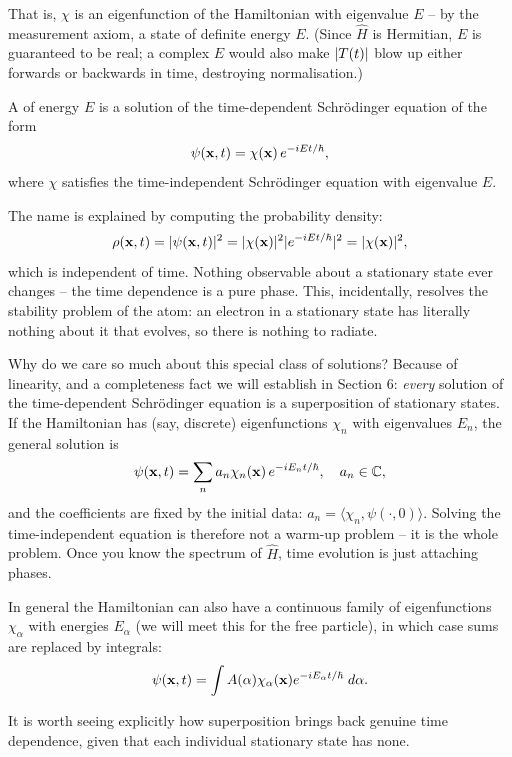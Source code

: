 \documentclass[a4paper]{scrartcl}
\newcommand{\inp}[2]{\langle #1, #2 \rangle}
\begin{document}
That is, $\chi$ is an eigenfunction of the Hamiltonian with eigenvalue $E$ -- by the measurement axiom, a state of definite energy $E$. (Since $\hat{H}$ is Hermitian, $E$ is guaranteed to be real; a complex $E$ would also make $\lvert T(t)\rvert$ blow up either forwards or backwards in time, destroying normalisation.)

\begin{definition}
    A  of energy $E$ is a solution of the time-dependent Schr\"odinger equation of the form
    $$
    \psi(\mathbf{x}, t) = \chi(\mathbf{x}) \, e^{-iEt/\hbar},
    $$
    where $\chi$ satisfies the time-independent Schr\"odinger equation with eigenvalue $E$.
\end{definition}

The name is explained by computing the probability density:
$$
\rho(\mathbf{x}, t) = \lvert\psi(\mathbf{x}, t)\rvert^2 = \lvert\chi(\mathbf{x})\rvert^2 \lvert e^{-iEt/\hbar}\rvert^2 = \lvert\chi(\mathbf{x})\rvert^2,
$$
which is independent of time. Nothing observable about a stationary state ever changes -- the time dependence is a pure phase. This, incidentally, resolves the stability problem of the atom: an electron in a stationary state has literally nothing about it that evolves, so there is nothing to radiate.

Why do we care so much about this special class of solutions? Because of linearity, and a completeness fact we will establish in Section 6: \emph{every} solution of the time-dependent Schr\"odinger equation is a superposition of stationary states. If the Hamiltonian has (say, discrete) eigenfunctions $\chi_n$ with eigenvalues $E_n$, the general solution is
$$
\psi(\mathbf{x}, t) = \sum_n a_n \chi_n(\mathbf{x}) \, e^{-iE_n t/\hbar}, \quad a_n \in \mathbb{C},
$$
and the coefficients are fixed by the initial data: $a_n = \inp{\chi_n}{\psi(\cdot, 0)}$. Solving the time-independent equation is therefore not a warm-up problem -- it is the whole problem. Once you know the spectrum of $\hat{H}$, time evolution is just attaching phases.

In general the Hamiltonian can also have a continuous family of eigenfunctions $\chi_\alpha$ with energies $E_\alpha$ (we will meet this for the free particle), in which case sums are replaced by integrals:
$$
\psi(\mathbf{x}, t) = \int A(\alpha) \chi_\alpha(\mathbf{x}) e^{-i E_\alpha t / \hbar} \; d \alpha.
$$

It is worth seeing explicitly how superposition brings back genuine time dependence, given that each individual stationary state has none.
\end{document}
